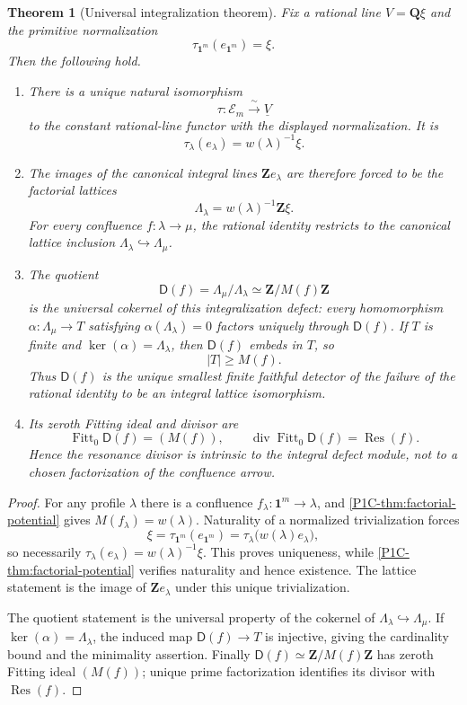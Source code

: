 \documentclass[11pt]{article}
\newtheorem{theorem}{Theorem}[section]
\theoremstyle{remark}
\newcommand{\Z}{\mathbf Z}
\providecommand{\Q}{\mathbf Q}
\begin{document}
\begin{theorem}[Universal integralization theorem]\label{P1C-thm:universal-integralization}
Fix a rational line $V=\Q\xi$ and the primitive normalization
\[
 \tau_{\mathbf1^m}(e_{\mathbf1^m})=\xi.
\]
Then the following hold.
\begin{enumerate}[label=\textup{(\roman*)}]
\item There is a unique natural isomorphism
\[
 \tau:\mathscr E_m\xrightarrow{\ \sim\ }\underline V
\]
to the constant rational-line functor with the displayed normalization.  It is
\[
 \boxed{\tau_\lambda(e_\lambda)=w(\lambda)^{-1}\xi.}
\]
\item The images of the canonical integral lines $\Z e_\lambda$ are therefore forced to be the
factorial lattices
\[
 \boxed{\Lambda_\lambda=w(\lambda)^{-1}\Z\xi.}
\]
For every confluence $f:\lambda\to\mu$, the rational identity restricts to the canonical lattice
inclusion $\Lambda_\lambda\hookrightarrow\Lambda_\mu$.
\item The quotient
\[
 \boxed{\mathsf D(f)=\Lambda_\mu/\Lambda_\lambda\simeq\Z/M(f)\Z}
\]
is the universal cokernel of this integralization defect: every homomorphism
$\alpha:\Lambda_\mu\to T$ satisfying $\alpha(\Lambda_\lambda)=0$ factors uniquely through
$\mathsf D(f)$.  If $T$ is finite and $\ker(\alpha)=\Lambda_\lambda$, then $\mathsf D(f)$ embeds
in $T$, so
\[
 |T|\ge M(f).
\]
Thus $\mathsf D(f)$ is the unique smallest finite faithful detector of the failure of the rational
identity to be an integral lattice isomorphism.
\item Its zeroth Fitting ideal and divisor are
\[
 \boxed{
 \operatorname{Fitt}_0\mathsf D(f)=(M(f)),
 \qquad
 \operatorname{div}\operatorname{Fitt}_0\mathsf D(f)
 =\operatorname{Res}(f).}
\]
Hence the resonance divisor is intrinsic to the integral defect module, not to a chosen
factorization of the confluence arrow.
\end{enumerate}
\end{theorem}

\begin{proof}
For any profile $\lambda$ there is a confluence $f_\lambda:\mathbf1^m\to\lambda$, and
\cref{P1C-thm:factorial-potential} gives $M(f_\lambda)=w(\lambda)$.  Naturality of a normalized
trivialization forces
\[
 \xi
 =\tau_{\mathbf1^m}(e_{\mathbf1^m})
 =\tau_\lambda\bigl(w(\lambda)e_\lambda\bigr),
\]
so necessarily $\tau_\lambda(e_\lambda)=w(\lambda)^{-1}\xi$.  This proves uniqueness, while
\cref{P1C-thm:factorial-potential} verifies naturality and hence existence.  The lattice statement is the
image of $\Z e_\lambda$ under this unique trivialization.

The quotient statement is the universal property of the cokernel of
$\Lambda_\lambda\hookrightarrow\Lambda_\mu$.  If $\ker(\alpha)=\Lambda_\lambda$, the induced map
$\mathsf D(f)\to T$ is injective, giving the cardinality bound and the minimality assertion.
Finally $\mathsf D(f)\simeq\Z/M(f)\Z$ has zeroth Fitting ideal $(M(f))$; unique prime
factorization identifies its divisor with $\operatorname{Res}(f)$.
\end{proof}
\end{document}
